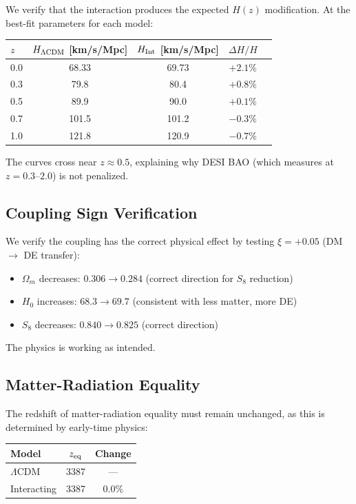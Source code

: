\documentclass[twocolumn,showpacs,preprintnumbers,amsmath,amssymb,prd]{revtex4-2}
\begin{document}
We verify that the interaction produces the expected $H(z)$ modification. At the best-fit parameters for each model:

\begin{center}
\begin{tabular}{lcccc}
\toprule
$z$ & $H_{\Lambda\rm CDM}$ [km/s/Mpc] & $H_{\rm Int}$ [km/s/Mpc] & $\Delta H/H$ \\
\midrule
0.0 & 68.33 & 69.73 & $+2.1\%$ \\
0.3 & 79.8 & 80.4 & $+0.8\%$ \\
0.5 & 89.9 & 90.0 & $+0.1\%$ \\
0.7 & 101.5 & 101.2 & $-0.3\%$ \\
1.0 & 121.8 & 120.9 & $-0.7\%$ \\
\bottomrule
\end{tabular}
\end{center}

The curves cross near $z \approx 0.5$, explaining why DESI BAO (which measures at $z = 0.3$--$2.0$) is not penalized.

\subsection{Coupling Sign Verification}

We verify the coupling has the correct physical effect by testing $\xi = +0.05$ (DM $\to$ DE transfer):
\begin{itemize}
    \item $\Omega_m$ decreases: $0.306 \to 0.284$ (correct direction for $S_8$ reduction)
    \item $H_0$ increases: $68.3 \to 69.7$ (consistent with less matter, more DE)
    \item $S_8$ decreases: $0.840 \to 0.825$ (correct direction)
\end{itemize}
The physics is working as intended.

\subsection{Matter-Radiation Equality}

The redshift of matter-radiation equality must remain unchanged, as this is determined by early-time physics:
\begin{center}
\begin{tabular}{lcc}
\toprule
Model & $z_{\rm eq}$ & Change \\
\midrule
$\Lambda$CDM & 3387 & --- \\
Interacting & 3387 & 0.0\% \\
\bottomrule
\end{tabular}
\end{center}
\end{document}

